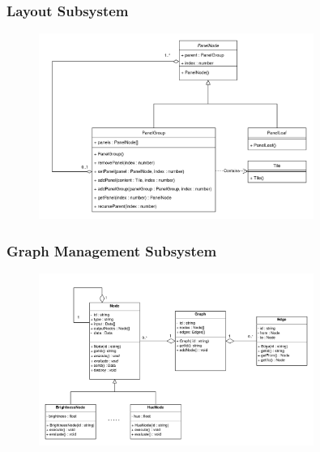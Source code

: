 \documentclass[11pt,a4paper]{article}
\begin{document}
\subsubsection*{Layout Subsystem}
\begin{figure}[htbp]
    \centering
      \href{https://drive.google.com/drive/u/2/folders/1rnYMSGTOmKY8_pOyJUIacjTxuubO_6NX}
      {\includegraphics[width=0.8\textwidth]{../diagramPng/Layout-Subsystem.png}}
\end{figure}

\subsubsection*{Graph Management Subsystem}
\begin{figure}[htbp]
  \centering
  \href{https://drive.google.com/drive/u/2/folders/1rnYMSGTOmKY8_pOyJUIacjTxuubO_6NX}
  {\includegraphics[width=0.8\textwidth]{../diagramPng/Graph-Subsystem.png}}
\end{figure}


\end{document}
